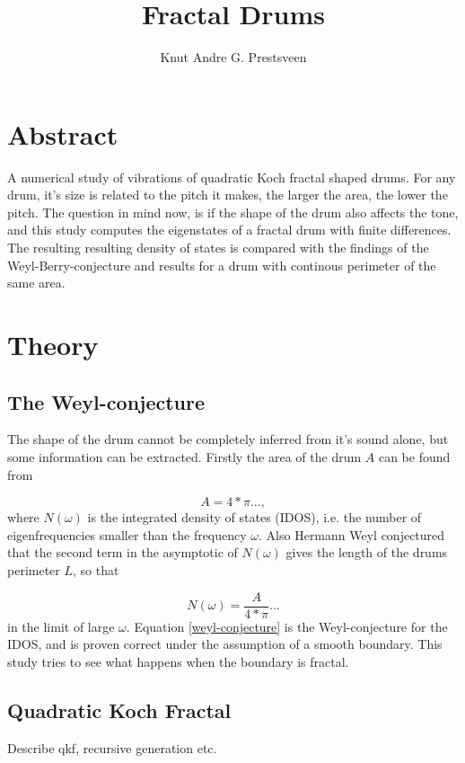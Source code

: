 \documentclass{article}
\title{Fractal Drums}
\author{Knut Andre G. Prestsveen}
\begin{document}
\maketitle

\section{Abstract}
A numerical study of vibrations of quadratic Koch fractal shaped drums. For any drum, it's size is related to the pitch it makes, the larger the area, the lower the pitch. The question in mind now, is if the shape of the drum also affects the tone, and this study computes the eigenstates of a fractal drum with finite differences. The resulting resulting density of states is compared with the findings of the Weyl-Berry-conjecture and results for a drum with continous perimeter of the same
area.

\section{Theory}
\subsection{The Weyl-conjecture}
The shape of the drum cannot be completely inferred from it's sound alone, but some information can be extracted. Firstly the area of the drum $A$ can be found from

\begin{equation}
    \label{area}
    A = 4*\pi ...,
\end{equation}
where $N(\omega)$ is the integrated density of states (IDOS), i.e. the number of eigenfrequencies smaller than the frequency $\omega$. Also Hermann Weyl conjectured that the second term in the asymptotic of $N(\omega)$ gives the length of the drums perimeter $L$, so that

\begin{equation}
    \label{weyl-conjecture}
    N(\omega) = \frac{A}{4*\pi}...
\end{equation}
in the limit of large $\omega$. Equation \ref{weyl-conjecture} is the Weyl-conjecture for the IDOS, and is proven correct under the assumption of a smooth boundary. This study tries to see what happens when the boundary is fractal.

\subsection{Quadratic Koch Fractal}
Describe qkf, recursive generation etc.
\end{document}
